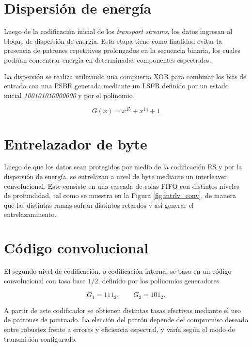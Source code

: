 	\section{Dispersión de energía}

	Luego de la codificación inicial de los \textit{transport streams}, los datos ingresan al bloque de dispersión de energía. Esta etapa tiene como finalidad evitar la presencia de patrones repetitivos prolongados en la secuencia binaria, los cuales podrían concentrar energía en determinadas componentes espectrales.

	La dispersión se realiza utilizando una compuerta XOR para combinar los bits de entrada con una PSBR generada mediante un LSFR definido por un estado inicial \textit{100101010000000} y por el polinomio

	\begin{equation}
		G(x) = x^{15} + x^{14} + 1
	\end{equation}

	\section{Entrelazador de byte}
	Luego de que los datos sean protegidos por medio de la codificación RS y por la dispersión de energía, se entrelazan a nivel de byte mediante un interleaver convolucional. Este consiste en una cascada de colas FIFO con distintos niveles de profundidad, tal como se muestra en la Figura \ref{fig:intrlv_conv}, de manera que las distintas ramas sufran distintos retardos y así generar el entrelazaminento.




	\section{Código convolucional}

	El segundo nivel de codificación, o codificación interna, se basa en un código convolucional con tasa base $1/2$,
	definido por los polinomios generadores

	\begin{equation}
		G_1 = 111_2, \qquad G_2 = 101_2 .
	\end{equation}

	A partir de este codificador se obtienen distintas tasas efectivas mediante el uso de
	patrones de puntuado. La elección del patrón depende del compromiso deseado entre
	robustez frente a errores y eficiencia espectral, y varía según el modo de transmisión
	configurado.



